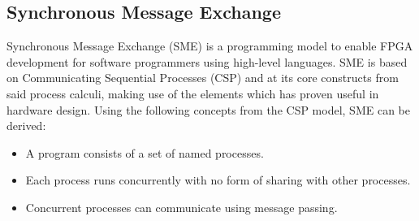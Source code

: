 \documentclass[a4paper, openany]{book}
\begin{document}
\begin{abstact}
\section{Synchronous Message Exchange}
\label{sec:SME}
Synchronous Message Exchange (SME) is a programming model to enable FPGA development for software programmers using high-level languages. SME is based on Communicating Sequential Processes (CSP) and at its core constructs from said process calculi, making use of the elements which has proven useful in hardware design\cite{sme}. Using the following concepts from the CSP model\cite{CSP}, SME can be derived:

\begin{itemize}
\item A program consists of a set of named processes.
\item Each process runs concurrently with no form of sharing with other processes.
\item Concurrent processes can communicate using message passing.
\end{itemize}


\end{abstact}
\end{document}
